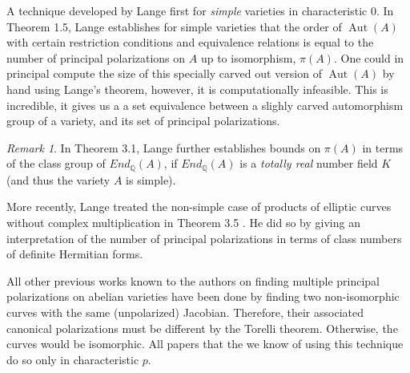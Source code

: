 \documentclass[12pt,reqno]{amsart}
\DeclareMathOperator{\Aut}{Aut}
\newcommand{\Q}{\mathbb{Q}}
\theoremstyle{definition}
\theoremstyle{remark}
\newtheorem*{remark}{Remark}
\begin{document}
A technique developed by Lange first for \textit{simple} varieties in characteristic 0. In \cite{several} Theorem 1.5, Lange establishes for simple varieties that the order of $\Aut(A)$ with certain restriction conditions and equivalence relations is equal to the number of principal polarizations on $A$ up to isomorphism, $\pi(A)$. One could in principal compute the size of this specially carved out version of $\Aut(A)$ by hand using Lange's theorem, however, it is computationally infeasible. This is incredible, it gives us a a set equivalence between a slighly carved automorphism group of a variety, and its set of principal polarizations.



\begin{remark} In Theorem 3.1, Lange further establishes bounds on $\pi(A)$ in terms of the class group of $End_{\Q}(A)$, if $End_{\Q}(A)$ is a \textit{totally real} number field $K$ (and thus the variety $A$ is simple). \end{remark}  

More recently, Lange treated the non-simple case of products of elliptic curves without complex multiplication in Theorem 3.5 \cite{newlange}. He did so by giving an interpretation of the number of principal polarizations in terms of class numbers of definite Hermitian forms.


All other previous works known to the authors on finding multiple principal polarizations on abelian varieties have been done by finding two non-isomorphic curves with the same (unpolarized) Jacobian. Therefore, their associated canonical polarizations must be different by the Torelli theorem. Otherwise, the curves would be isomorphic. All papers that the we know of using this technique do so only in characteristic $p$. 
\end{document}

